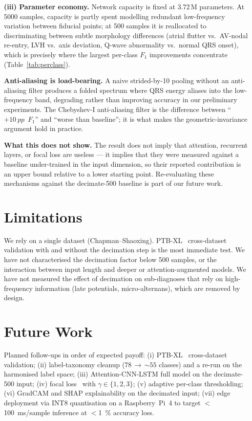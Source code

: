 \documentclass[conference]{IEEEtran}
\begin{document}
\textbf{(iii) Parameter economy.} Network capacity is fixed at
\num{3.72}\,M parameters. At \num{5000} samples, capacity is partly
spent modelling redundant low-frequency variation between fiducial
points; at \num{500} samples it is reallocated to discriminating between
subtle morphology differences (atrial flutter vs.\ AV-nodal re-entry,
LVH vs.\ axis deviation, Q-wave abnormality vs.\ normal QRS onset),
which is precisely where the largest per-class $F_1$ improvements
concentrate (Table~\ref{tab:perclass}).

\textbf{Anti-aliasing is load-bearing.} A naive strided-by-10 pooling
without an anti-aliasing filter produces a folded spectrum where QRS
energy aliases into the low-frequency band, degrading rather than
improving accuracy in our preliminary experiments. The Chebyshev-I
anti-aliasing filter is the difference between
``$+\SI{10}{pp}$~$F_1$'' and ``worse than baseline'';
it is what makes the geometric-invariance argument hold in practice.

\textbf{What this does not show.}
The result does not imply that attention, recurrent layers, or focal
loss are useless --- it implies that they were measured against a
baseline under-trained in the input dimension, so their reported
contribution is an upper bound relative to a lower starting point.
Re-evaluating these mechanisms against the decimate-\num{500} baseline
is part of our future work.

\section{Limitations}
We rely on a single dataset (Chapman--Shaoxing). PTB-XL~\cite{wagner2020}
cross-dataset validation with and without the decimation step is the
most immediate test. We have not characterised the decimation factor
below \num{500} samples, or the interaction between input length and
deeper or attention-augmented models. We have not measured the effect
of decimation on sub-diagnoses that rely on high-frequency information
(late potentials, micro-alternans), which are removed by design.

\section{Future Work}
Planned follow-ups in order of expected payoff:
(i) PTB-XL~\cite{wagner2020} cross-dataset validation;
(ii) label-taxonomy cleanup (\num{78}\,$\rightarrow$\,$\sim\!\num{55}$
classes) and a re-run on the harmonised label space;
(iii) Attention-CNN-LSTM full model on the decimate-\num{500} input;
(iv) focal loss~\cite{lin2017} with $\gamma\in\{1,2,3\}$;
(v) adaptive per-class thresholding;
(vi) GradCAM and SHAP explainability on the decimated input;
(vii) edge deployment via INT8 quantisation on a Raspberry~Pi~4 to
target $<$\SI{100}{\milli\second}/sample inference at $<$\SI{1}{\percent}
accuracy loss.
\end{document}
